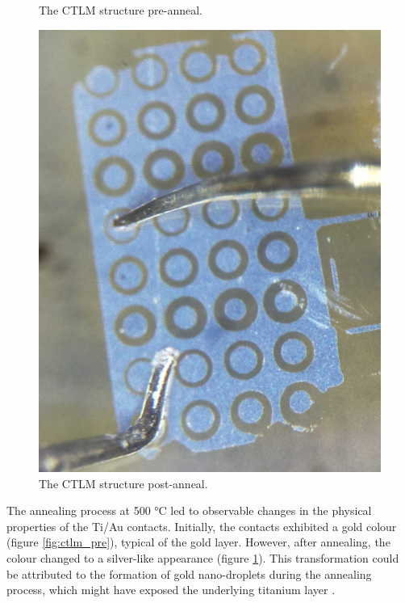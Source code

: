 \begin{refsection}
\begin{figure}[H]
\begin{minipage}{0.40\textwidth}
        \caption{The CTLM structure pre-anneal.}
        \label{fig:ctlm_pre}
    \end{minipage}\hfill
    \begin{minipage}{0.48\textwidth}
        \centering
        \includegraphics[width=\textwidth]{Chapter3/Figs/post_anneal_ctlm.jpg}
        \caption{The CTLM structure post-anneal.}
        \label{fig:ctlm_post}
    \end{minipage}
\end{figure}

The annealing process at 500 \si{\degreeCelsius} led to observable changes in the physical properties of the Ti/Au contacts. Initially, the contacts exhibited a gold colour (figure \ref{fig:ctlm_pre}), typical of the gold layer. However, after annealing, the colour changed to a silver-like appearance (figure \ref{fig:ctlm_post}). This transformation could be attributed to the formation of gold nano-droplets during the annealing process, which might have exposed the underlying titanium layer \cite{Klimovskaya2011}.


\end{refsection}
